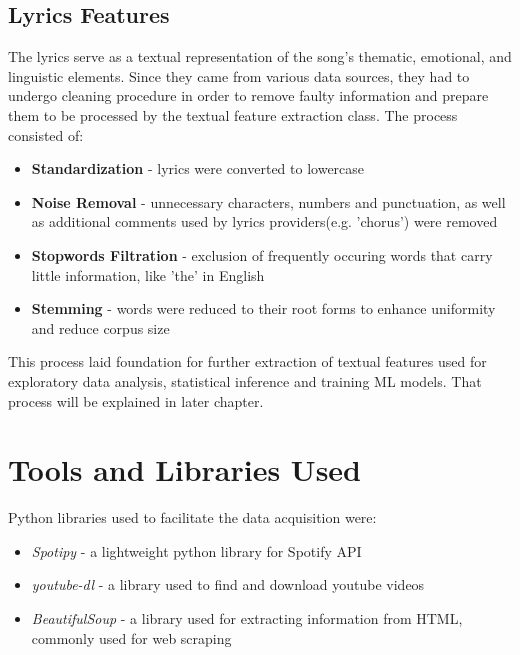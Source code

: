 \subsection{Lyrics Features}
 The lyrics serve as a textual representation of the song's thematic,
 emotional, and linguistic elements. Since they came from various data sources,
 they had  to undergo cleaning procedure in order to remove faulty information
 and prepare them to be processed by the textual feature extraction class. The
 process consisted of:
 \begin{itemize}
  \item \textbf{Standardization} - lyrics were converted to lowercase
  \item \textbf{Noise Removal} - unnecessary characters, numbers and
    punctuation, as well as additional comments used by lyrics providers(e.g.
    'chorus') were removed
  \item \textbf{Stopwords Filtration} - exclusion of frequently occuring words
    that carry little information, like 'the' in English
  \item \textbf{Stemming} - words were reduced to their root forms to enhance
    uniformity and reduce corpus size
 \end{itemize}

 This process laid foundation for further extraction of textual features used
 for exploratory data analysis, statistical inference and training ML models.
 That process will be explained in later chapter.



\section{Tools and Libraries Used}
\label{sec:toolsandlibrariesused}
Python libraries used to facilitate the data acquisition were:
\begin{itemize}
  \item \textit{Spotipy} - a lightweight python library for Spotify API
  \item \textit{youtube-dl} - a library used to find and download youtube videos
  \item \textit{BeautifulSoup} - a library used for extracting information from
    HTML, commonly used for web scraping
\end{itemize}



